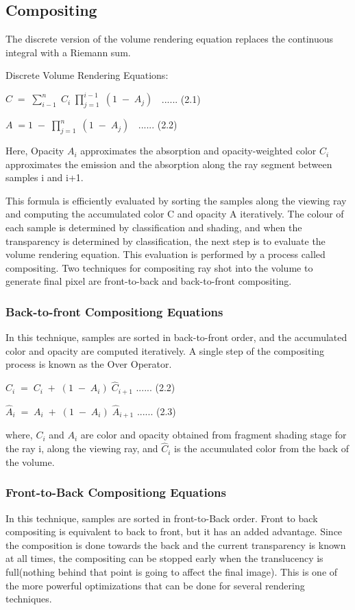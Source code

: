 \subsection{Compositing }

The discrete version of the volume rendering equation replaces the continuous integral with a Riemann sum. 

Discrete Volume Rendering Equations:


$ C \; = \; \sum\limits_{i-1}^{n} \; C_i \; \prod\limits_{j=1}^{i-1} \; ( 1 \; - \; A_j) \; \; $    ...... (2.1)

         
$ A \; = 1 \; - \; \prod\limits_{j=1}^{n} \; ( 1 \; - \; A_j) \; \; $   ...... (2.2) 

Here, Opacity $A_i$ approximates the absorption and opacity-weighted color $C_i$ approximates the emission and the absorption along the ray segment between samples i and i+1. 

This formula is efficiently evaluated by sorting the samples along the viewing ray and computing the accumulated color C and opacity A iteratively. The colour of each sample is determined by classification and shading, and when the transparency is determined by classification, the next step is to evaluate the volume rendering equation. This evaluation is performed by a process called compositing. Two techniques for compositing ray shot into the volume to generate final pixel are front-to-back and back-to-front compositing.


\subsubsection{Back-to-front Compositiong Equations}

In this technique, samples are sorted in back-to-front order, and the accumulated color and opacity are computed iteratively. A single step of the compositing process is known as the Over Operator.  

$  \hat{C}_i \; = \; C_i \; + \; (1 \; - \; A_i ) \; \hat{C}_{i+1}  $   ...... (2.2)

$  \hat{A}_i \; = \; A_i \; + \; (1 \; - \; A_i ) \; \hat{A}_{i+1}  $   ...... (2.3)

where, ${C}_i$ and ${A}_i$ are color and opacity obtained from fragment shading stage for the ray i, along the viewing ray, and $\hat{C}_i$ is the accumulated color from the back of the volume.

\subsubsection{Front-to-Back Compositiong Equations}
In this technique, samples are sorted in front-to-Back order. Front to back compositing is equivalent to back to front, but it has an added advantage. Since the composition is done towards the back and the current transparency is known at all times, the compositing can be stopped early when the translucency is full(nothing behind that point is going to affect the final image). This is one of the more powerful optimizations that can be done for several rendering techniques.

